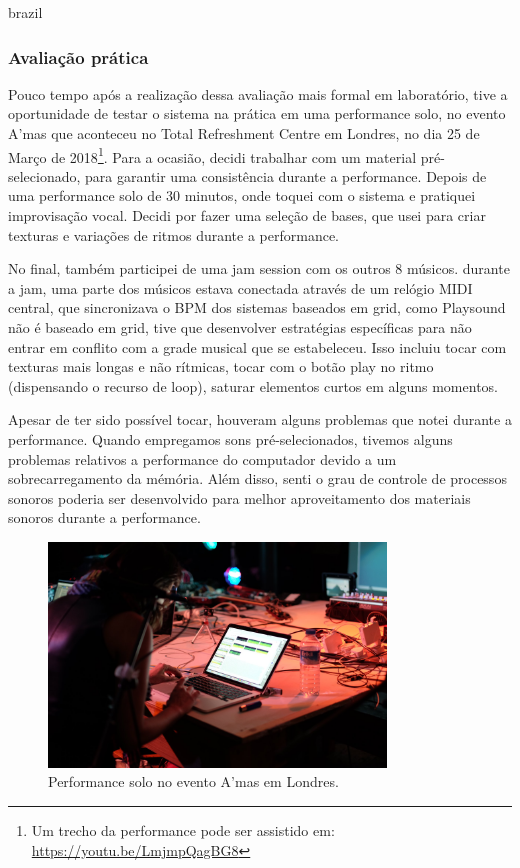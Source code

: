 \begin{otherlanguage*}{brazil}
\begin{description}
\subsubsection{Avaliação prática}

Pouco tempo após a realização dessa avaliação mais formal em laboratório, tive a oportunidade de testar o sistema na prática em uma performance solo, no evento A'mas que aconteceu no Total Refreshment Centre em Londres, no dia 25 de Março de 2018\footnote{Um trecho da performance pode ser assistido em: \url{https://youtu.be/LmjmpQagBG8}}. Para a ocasião, decidi trabalhar com um material pré-selecionado, para garantir uma consistência durante a performance. Depois de uma performance solo de 30 minutos, onde toquei com o sistema e pratiquei improvisação vocal. Decidi por fazer uma seleção de bases, que usei para criar texturas e variações de ritmos durante a performance. 

No final, também participei de uma jam session com os outros 8 músicos. durante a jam, uma parte dos músicos estava conectada através de um relógio MIDI central, que sincronizava o BPM dos sistemas baseados em grid, como Playsound não é baseado em grid, tive que desenvolver estratégias específicas para não entrar em conflito com a grade musical que se estabeleceu. Isso incluiu tocar com texturas mais longas e não rítmicas, tocar com o botão play no ritmo (dispensando o recurso de loop), saturar elementos curtos em alguns momentos.

Apesar de ter sido possível tocar, houveram alguns problemas que notei durante a performance. Quando empregamos sons pré-selecionados, tivemos alguns problemas relativos a performance do computador devido a um sobrecarregamento da mémória. Além disso, senti o grau de controle de processos sonoros poderia ser desenvolvido para melhor aproveitamento dos materiais sonoros durante a performance.

\begin{figure}
\centering
\includegraphics[width=0.8\textwidth]{pictures/cap4/ariane_amas}
\caption{\label{amas}Performance solo no evento A'mas em Londres.}
\label{fig:amas}
\end{figure}



\end{description}
\end{otherlanguage*}
